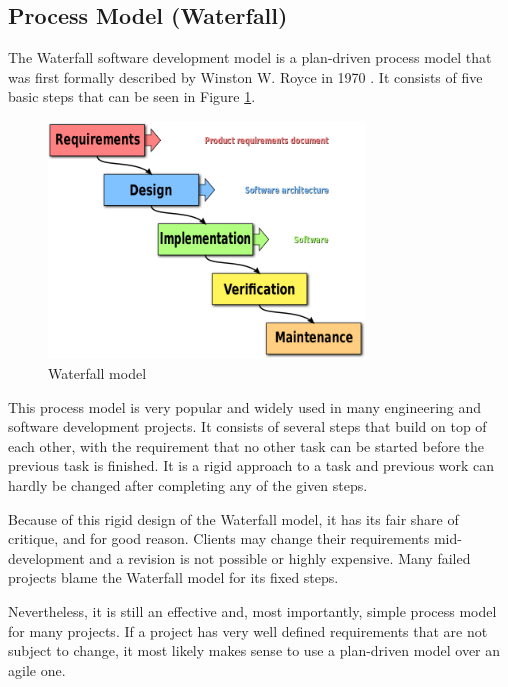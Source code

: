 \documentclass[12p]{article}
\begin{document}
	\subsection{Process Model (Waterfall)}
	
	
	The Waterfall software development model is a plan-driven process model that was first formally described by Winston W. Royce in 1970 \cite{Royce1970}. It consists of five basic steps that can be seen in Figure \ref{fig:WaterfallDiagram}.
    
    \begin{figure}[ht]
        \center
        \includegraphics[width=0.75\textwidth]{methodology/800px-Waterfall_model.png}
        \caption{Waterfall model \cite{WaterfallDiagram}}
        \label{fig:WaterfallDiagram}
    \end{figure}
    
    This process model is very popular and widely used in many engineering and software development projects. It consists of several steps that build on top of each other, with the requirement that no other task can be started before the previous task is finished. It is a rigid approach to a task and previous work can hardly be changed after completing any of the given steps.
    
    Because of this rigid design of the Waterfall model, it has its fair share of critique, and for good reason. Clients may change their requirements mid-development and a revision is not possible or highly expensive. Many failed projects blame the Waterfall model for its fixed steps.
    
    Nevertheless, it is still an effective and, most importantly, simple process model for many projects. If a project has very well defined requirements that are not subject to change, it most likely makes sense to use a plan-driven model over an agile one.
    
\end{document}
